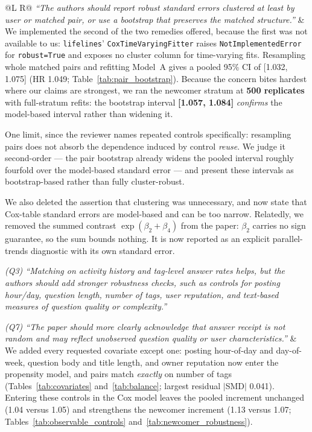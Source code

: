 \documentclass[11pt]{article}
\begin{document}
\begin{longtable}{@{}L R@{}}
\textit{``The authors should report robust standard errors clustered at least by user or matched pair, or use a bootstrap that preserves the matched structure.''} &
We implemented the second of the two remedies offered, because the first was not available to us: \texttt{lifelines}' \texttt{CoxTimeVaryingFitter} raises \texttt{NotImplementedError} for \texttt{robust=True} and exposes no cluster column for time-varying fits. Resampling whole matched pairs and refitting Model~A gives a pooled 95\% CI of [1.032, 1.075] (HR 1.049; Table~\ref{tab:pair_bootstrap}). Because the concern bites hardest where our claims are strongest, we ran the newcomer stratum at \textbf{500 replicates} with full-stratum refits: the bootstrap interval \textbf{[1.057, 1.084]} \emph{confirms} the model-based interval rather than widening it.

One limit, since the reviewer names repeated controls specifically: resampling pairs does not absorb the dependence induced by control \emph{reuse}. We judge it second-order --- the pair bootstrap already widens the pooled interval roughly fourfold over the model-based standard error --- and present these intervals as bootstrap-based rather than fully cluster-robust.

We also deleted the assertion that clustering was unnecessary, and now state that Cox-table standard errors are model-based and can be too narrow. Relatedly, we removed the summed contrast $\exp(\beta_2+\beta_4)$ from the paper: $\beta_2$ carries no sign guarantee, so the sum bounds nothing. It is now reported as an explicit parallel-trends diagnostic with its own standard error. \\
\midrule

\textit{(Q3) ``Matching on activity history and tag-level answer rates helps, but the authors should add stronger robustness checks, such as controls for posting hour/day, question length, number of tags, user reputation, and text-based measures of question quality or complexity.''}

\textit{(Q7) ``The paper should more clearly acknowledge that answer receipt is not random and may reflect unobserved question quality or user characteristics.''} &
We added every requested covariate except one: posting hour-of-day and day-of-week, question body and title length, and owner reputation now enter the propensity model, and pairs match \emph{exactly} on number of tags (Tables~\ref{tab:covariates} and~\ref{tab:balance}; largest residual $|$SMD$|$ 0.041). Entering these controls in the Cox model leaves the pooled increment unchanged (1.04 versus 1.05) and strengthens the newcomer increment (1.13 versus 1.07; Tables~\ref{tab:observable_controls} and~\ref{tab:newcomer_robustness}).


\end{longtable}
\end{document}
